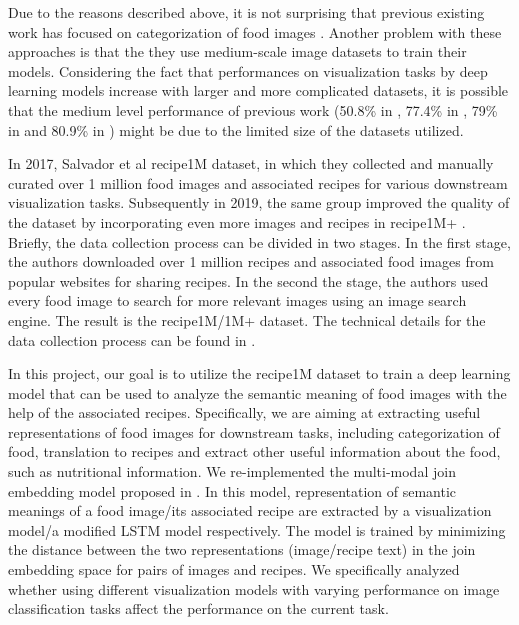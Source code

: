 \documentclass[10pt,twocolumn,letterpaper]{article}
\begin{document}
Due to the reasons described above, it is not surprising that previous existing work has focused on categorization of food images \cite{salvador2017learning} \cite{liu2016deepfood}.  Another problem with these approaches is that the they use medium-scale image datasets to train their models.  Considering the fact that performances on visualization tasks by deep learning models increase with larger and more complicated datasets, it is possible that the medium level performance of previous work (50.8\% in \cite{salvador2017learning}, 77.4\% in \cite{liu2016deepfood}, 79\% in \cite{7410503} and 80.9\% in \cite{ofli2017saki}) might be due to the limited size of the datasets utilized.

In 2017, Salvador et al \cite{salvador2017learning} recipe1M dataset, in which they collected and manually curated over 1 million food images and associated recipes for various downstream visualization tasks.  Subsequently in 2019, the same group improved the quality of the dataset by incorporating even more images and recipes in recipe1M+ \cite{marin2019learning}.  Briefly, the data collection process can be divided in two stages.  In the first stage, the authors downloaded over 1 million recipes and associated food images from popular websites for sharing recipes.  In the second the stage, the authors used every food image to search for more relevant images using an image search engine.  The result is the recipe1M/1M+ dataset.  The technical details for the data collection process can be found in \cite{marin2019learning}.

In this project, our goal is to utilize the recipe1M dataset to train a deep learning model that can be used to analyze the semantic meaning of food images with the help of the associated recipes.  Specifically, we are aiming at extracting useful representations of food images for downstream tasks, including categorization of food, translation to recipes and extract other useful information about the food, such as nutritional information.  We re-implemented the multi-modal join embedding model proposed in \cite{marin2019learning}.  In this model, representation of semantic meanings of a food image/its associated recipe are extracted by a visualization model/a modified LSTM model respectively.  The model is trained by minimizing the distance between the two representations (image/recipe text) in the join embedding space for pairs of images and recipes.  We specifically analyzed whether using different visualization models with varying performance on image classification tasks affect the performance on the current task.
\end{document}
